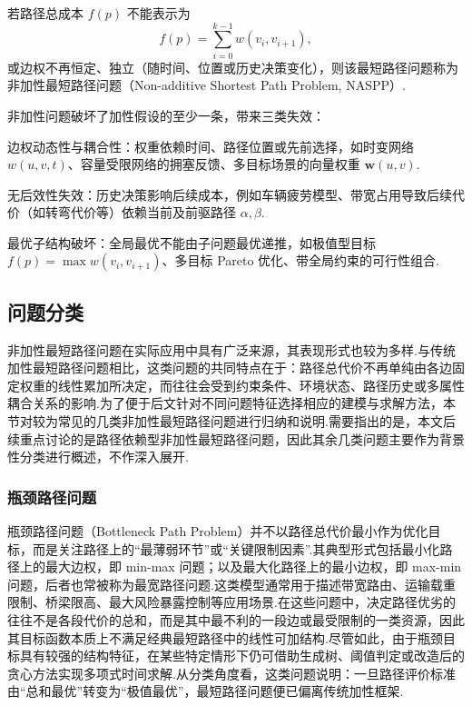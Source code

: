 \begin{definition}[非加性最短路径问题]
若路径总成本 $f(p)$ 不能表示为
\[
  f(p) = \sum_{i=0}^{k-1} w(v_i, v_{i+1}),
\]
或边权不再恒定、独立（随时间、位置或历史决策变化），则该最短路径问题称为非加性最短路径问题（Non-additive Shortest Path Problem, NASPP）.
\end{definition}

非加性问题破坏了加性假设的至少一条，带来三类失效：

边权动态性与耦合性：权重依赖时间、路径位置或先前选择，如时变网络 $w(u,v,t)$、容量受限网络的拥塞反馈、多目标场景的向量权重 $\mathbf{w}(u,v)$.

无后效性失效：历史决策影响后续成本，例如车辆疲劳模型、带宽占用导致后续代价（如转弯代价等）依赖当前及前驱路径 $\alpha, \beta$.

最优子结构破坏：全局最优不能由子问题最优递推，如极值型目标 $f(p)=\max w(v_i,v_{i+1})$、多目标 Pareto 优化、带全局约束的可行性组合.

\subsection{问题分类}

非加性最短路径问题在实际应用中具有广泛来源，其表现形式也较为多样.与传统加性最短路径问题相比，这类问题的共同特点在于：路径总代价不再单纯由各边固定权重的线性累加所决定，而往往会受到约束条件、环境状态、路径历史或多属性耦合关系的影响.为了便于后文针对不同问题特征选择相应的建模与求解方法，本节对较为常见的几类非加性最短路径问题进行归纳和说明.需要指出的是，本文后续重点讨论的是路径依赖型非加性最短路径问题，因此其余几类问题主要作为背景性分类进行概述，不作深入展开.

\subsubsection{瓶颈路径问题}

瓶颈路径问题（Bottleneck Path Problem）并不以路径总代价最小作为优化目标，而是关注路径上的“最薄弱环节”或“关键限制因素”.其典型形式包括最小化路径上的最大边权，即 min-max 问题；以及最大化路径上的最小边权，即 max-min 问题，后者也常被称为最宽路径问题.这类模型通常用于描述带宽路由、运输载重限制、桥梁限高、最大风险暴露控制等应用场景.在这些问题中，决定路径优劣的往往不是各段代价的总和，而是其中最不利的一段边或最受限制的一类资源，因此其目标函数本质上不满足经典最短路径中的线性可加结构.尽管如此，由于瓶颈目标具有较强的结构特征，在某些特定情形下仍可借助生成树、阈值判定或改造后的贪心方法实现多项式时间求解.从分类角度看，这类问题说明：一旦路径评价标准由“总和最优”转变为“极值最优”，最短路径问题便已偏离传统加性框架\cite{pollack1960maxcap,edmonds1972theoretical,camerini1984random,gj1979np}.

